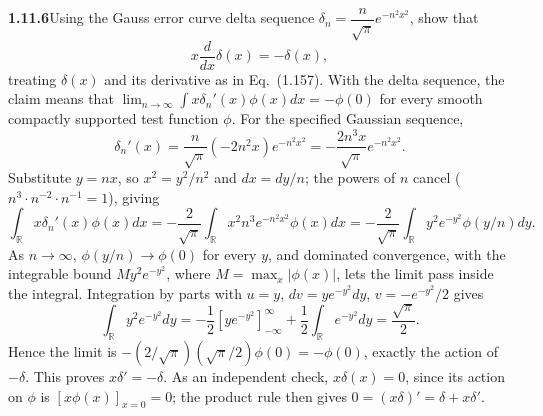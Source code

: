 \par\bigskip
\noindent\textbf{1.11.6}\quad Using the Gauss error curve delta sequence
$\delta_{n}=\dfrac{n}{\sqrt{\pi}}e^{-n^{2}x^{2}}$, show that
\[
x\frac{d}{dx}\delta(x)=-\delta(x),
\]
treating $\delta(x)$ and its derivative as in Eq.~(1.157).
\solution
With the delta sequence, the claim means that
$\lim_{n\to\infty}\int x\delta_n'(x)\phi(x)dx=-\phi(0)$ for every smooth
compactly supported test function $\phi$.
For the specified Gaussian sequence,
\[
 \delta_n'(x)=\frac n{\sqrt\pi}(-2n^2x)e^{-n^2x^2}
 =-\frac{2n^3x}{\sqrt\pi}e^{-n^2x^2}.
\]
Substitute $y=nx$, so $x^2=y^2/n^2$ and $dx=dy/n$; the powers of $n$
cancel ($n^3\cdot n^{-2}\cdot n^{-1}=1$), giving
\[
 \int_{\mathbb R}x\delta_n'(x)\phi(x)dx
 =-\frac2{\sqrt\pi}\int_{\mathbb R}x^2n^3e^{-n^2x^2}\phi(x)dx
 =-\frac2{\sqrt\pi}\int_{\mathbb R}y^2e^{-y^2}\phi(y/n)dy.
\]
As $n\to\infty$, $\phi(y/n)\to\phi(0)$ for every $y$, and dominated
convergence, with the integrable bound $My^2e^{-y^2}$, where
$M=\max_x|\phi(x)|$,
lets the limit pass inside the integral. Integration by parts with
$u=y$, $dv=ye^{-y^2}dy$, $v=-e^{-y^2}/2$ gives
\[
 \int_{\mathbb R}y^2e^{-y^2}dy
 =-\frac12[y e^{-y^2}]_{-\infty}^\infty
       +\frac12\int_{\mathbb R}e^{-y^2}dy=\frac{\sqrt\pi}{2}.
\]
Hence the limit is $-(2/\sqrt\pi)(\sqrt\pi/2)\phi(0)=-\phi(0)$, exactly
the action of $-\delta$. This proves $x\delta'=-\delta$. As an
independent check, $x\delta(x)=0$, since its action on $\phi$ is
$[x\phi(x)]_{x=0}=0$; the product rule then gives
$0=(x\delta)'=\delta+x\delta'$.


